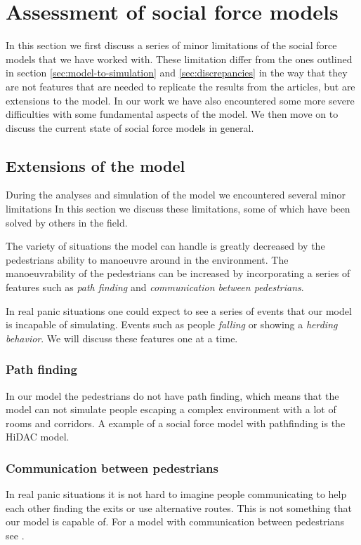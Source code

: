 \section{Assessment of social force models}
\label{sec:assessment}
In this section we first discuss a series of minor limitations of the social force models 
that we have worked with. These limitation differ from the ones outlined in 
section \ref{sec:model-to-simulation} and \ref{sec:discrepancies} in the way that 
they are not features that are needed to replicate the results from the articles, 
but are extensions to the model.
In our work we have also encountered some more severe difficulties with some 
fundamental aspects of the model.
We then move on to discuss the current state of social force models in general. 

\subsection{Extensions of the model}
During the analyses and simulation of the model we encountered several minor limitations 
In this section we discuss these limitations, some of which have been solved by others in the 
field. 

The variety of situations the model can handle is greatly decreased by the 
pedestrians ability to manoeuvre around in the environment. The manoeuvrability of 
the pedestrians can be increased by incorporating a series of features such as 
\emph{path finding} and \emph{communication between pedestrians}. 

In real panic situations one could expect to see a series of events that our 
model is incapable of simulating. Events such as people \emph{falling} or showing a 
\emph{herding behavior}. We will discuss these features one at a time.

\subsubsection{Path finding}
In our model the pedestrians do not have path finding, which means that the model 
can not simulate people escaping a complex environment with a lot of rooms 
and corridors. A example of a social force model with pathfinding is the HiDAC 
model\cite{HiDAC}.

\subsubsection{Communication between pedestrians}
In real panic situations it is not hard to imagine people communicating to help each other finding the exits or use alternative routes. This is 
not something that our model is capable of. For a model with communication between 
pedestrians see \cite{HiDAC}.

